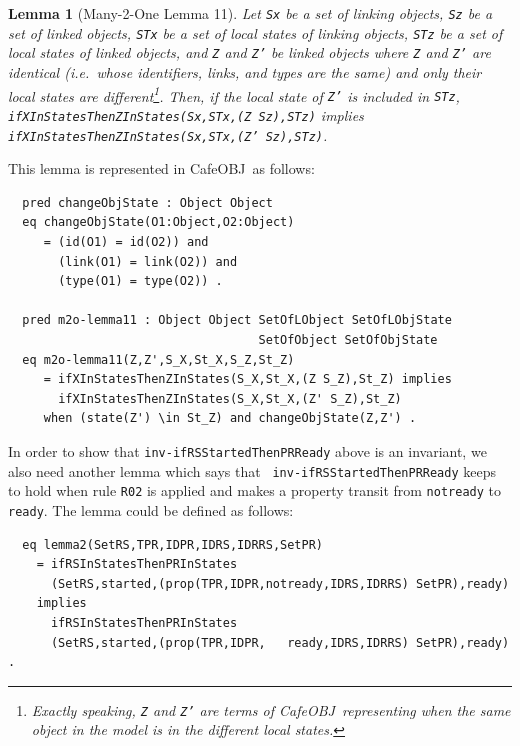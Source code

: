 \documentclass[12pt]{report}
\newtheorem{lemma}{Lemma}
\newcommand{\stt}[1]{{\small{\tt {#1}}}}
\newcommand{\cafeobj}{{\sf CafeOBJ}~}
\begin{document}
\begin{lemma}[Many-2-One Lemma 11]
  Let {\tt Sx} be a set of linking objects, {\tt Sz} be a set of
  linked objects, {\tt STx} be a set of local states of linking
  objects, {\tt STz} be a set of local states of linked objects, and
  {\tt Z} and {\tt Z'} be linked objects where {\tt Z} and {\tt Z'}
  are identical (i.e.\ whose identifiers, links, and types are the
  same) and only their local states are different\footnote{Exactly
    speaking, {\tt Z} and {\tt Z'} are terms of \cafeobj representing
    when the same object in the model is in the different local
    states.}.  Then, if the local state of {\tt Z'} is included in
  {\tt STz}, \stt{ifXInStatesThenZInStates(Sx,STx,(Z Sz),STz)}
  implies\\ \stt{ifXInStatesThenZInStates(Sx,STx,(Z' Sz),STz)}.
\end{lemma}
This lemma is represented in \cafeobj as follows:
\begin{verbatim}
  pred changeObjState : Object Object
  eq changeObjState(O1:Object,O2:Object)
     = (id(O1) = id(O2)) and 
       (link(O1) = link(O2)) and
       (type(O1) = type(O2)) .

  pred m2o-lemma11 : Object Object SetOfLObject SetOfLObjState
                                   SetOfObject SetOfObjState
  eq m2o-lemma11(Z,Z',S_X,St_X,S_Z,St_Z)
     = ifXInStatesThenZInStates(S_X,St_X,(Z S_Z),St_Z) implies
       ifXInStatesThenZInStates(S_X,St_X,(Z' S_Z),St_Z) 
     when (state(Z') \in St_Z) and changeObjState(Z,Z') .
\end{verbatim}
In order to show that {\tt inv-ifRSStartedThenPRReady} above is an
invariant, we also need another lemma which says that {\tt
  inv-ifRSStartedThenPRReady} keeps to hold when rule {\tt R02} is
applied and makes a property transit from {\tt notready} to {\tt
  ready}.  The lemma could be defined as follows:
\begin{verbatim}
  eq lemma2(SetRS,TPR,IDPR,IDRS,IDRRS,SetPR)
    = ifRSInStatesThenPRInStates
      (SetRS,started,(prop(TPR,IDPR,notready,IDRS,IDRRS) SetPR),ready)
    implies
      ifRSInStatesThenPRInStates
      (SetRS,started,(prop(TPR,IDPR,   ready,IDRS,IDRRS) SetPR),ready) .
\end{verbatim}
\end{document}
